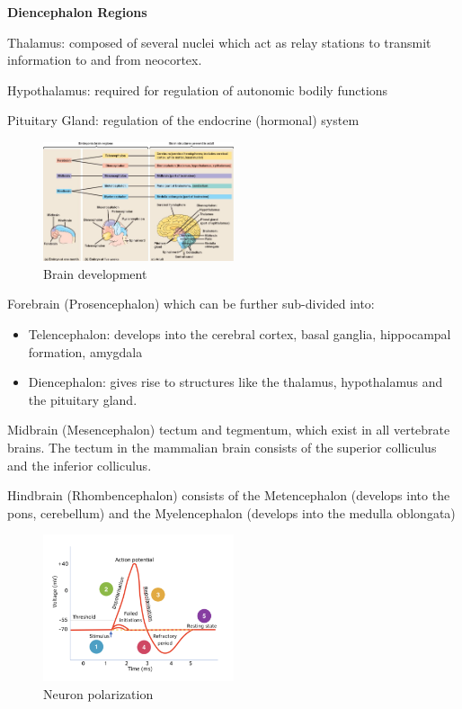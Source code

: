 \documentclass{article}
\begin{document}
\noindent \textbf{Diencephalon Regions}

Thalamus: composed of several nuclei which act as relay stations to transmit information to and from neocortex.

Hypothalamus: required for regulation of autonomic bodily functions

Pituitary Gland: regulation of the endocrine (hormonal) system

\begin{figure}[h]
\centering
\includegraphics[width=0.5\textwidth]{assets/development.png}
\caption{Brain development}
\end{figure}

\noindent Forebrain (Prosencephalon) which can be further sub-divided into:
\begin{itemize}
    \item Telencephalon: develops into the cerebral cortex, basal ganglia, hippocampal formation, amygdala
    \item Diencephalon: gives rise to structures like the thalamus, hypothalamus and the pituitary gland.
\end{itemize}

\noindent Midbrain (Mesencephalon) tectum and tegmentum, which exist in all vertebrate brains. The tectum in the mammalian brain consists of the superior colliculus and the inferior colliculus.

\noindent Hindbrain (Rhombencephalon) consists of the Metencephalon (develops into the pons, cerebellum) and the Myelencephalon (develops into the medulla oblongata)

\begin{figure}[h]
\centering
\includegraphics[width=0.5\textwidth]{assets/polarization.png}
\caption{Neuron polarization}
\end{figure}
\end{document}
